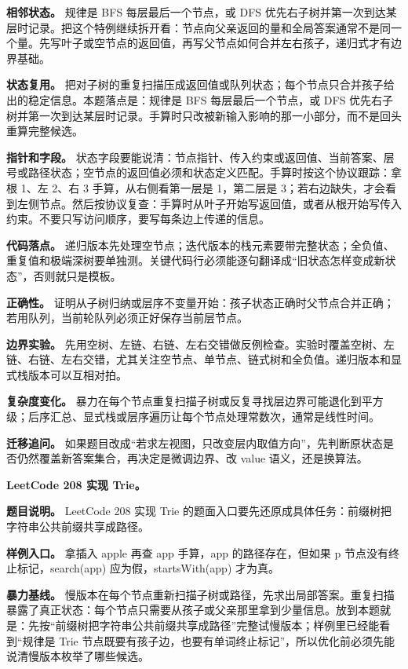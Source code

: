 \textbf{相邻状态。} 规律是 BFS 每层最后一个节点，或 DFS 优先右子树并第一次到达某层时记录。把这个特例继续拆开看：节点向父亲返回的量和全局答案通常不是同一个量。先写叶子或空节点的返回值，再写父节点如何合并左右孩子，递归式才有边界基础。

\textbf{状态复用。} 把对子树的重复扫描压成返回值或队列状态；每个节点只合并孩子给出的稳定信息。本题落点是：规律是 BFS 每层最后一个节点，或 DFS 优先右子树并第一次到达某层时记录。手算时只改被新输入影响的那一小部分，而不是回头重算完整候选。

\textbf{指针和字段。} 状态字段要能说清：节点指针、传入约束或返回值、当前答案、层号或路径状态；空节点的返回值必须和状态定义匹配。手算时按这个协议跟踪：拿根 1、左 2、右 3 手算，从右侧看第一层是 1，第二层是 3；若右边缺失，才会看到左侧节点。然后按协议复查：手算时从叶子开始写返回值，或者从根开始写传入约束。不要只写访问顺序，要写每条边上传递的信息。

\textbf{代码落点。} 递归版本先处理空节点；迭代版本的栈元素要带完整状态；全负值、重复值和极端深树要单独测。关键代码行必须能逐句翻译成“旧状态怎样变成新状态”，否则就只是模板。

\textbf{正确性。} 证明从子树归纳或层序不变量开始：孩子状态正确时父节点合并正确；若用队列，当前轮队列必须正好保存当前层节点。

\textbf{边界实验。} 先用空树、左链、右链、左右交错做反例检查。实验时覆盖空树、左链、右链、左右交错，尤其关注空节点、单节点、链式树和全负值。递归版本和显式栈版本可以互相对拍。

\textbf{复杂度变化。} 暴力在每个节点重复扫描子树或反复寻找层边界可能退化到平方级；后序汇总、显式栈或层序遍历让每个节点处理常数次，通常是线性时间。

\textbf{迁移追问。} 如果题目改成“若求左视图，只改变层内取值方向”，先判断原状态是否仍然覆盖新答案集合，再决定是微调边界、改 value 语义，还是换算法。

\noindent\textbf{LeetCode 208 实现 Trie。}

\textbf{题目说明。} LeetCode 208 实现 Trie 的题面入口要先还原成具体任务：前缀树把字符串公共前缀共享成路径。

\textbf{样例入口。} 拿插入 apple 再查 app 手算，app 的路径存在，但如果 p 节点没有终止标记，search(app) 应为假，startsWith(app) 才为真。

\textbf{暴力基线。} 慢版本在每个节点重新扫描子树或路径，先求出局部答案。重复扫描暴露了真正状态：每个节点只需要从孩子或父亲那里拿到少量信息。放到本题就是：先按“前缀树把字符串公共前缀共享成路径”完整试慢版本；样例里已经能看到“规律是 Trie 节点既要有孩子边，也要有单词终止标记”，所以优化前必须先能说清慢版本枚举了哪些候选。

